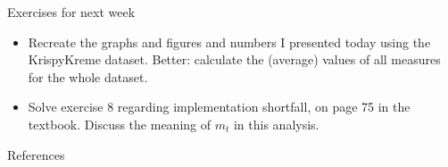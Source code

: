 \documentclass[english,10pt
,aspectratio=169
]{beamer}
\begin{document}
\begin{frame}{Exercises for next week}
	\begin{itemize}
		\item Recreate the graphs and figures and numbers I presented today using the KrispyKreme dataset. Better: calculate the (average) values of all measures for the whole dataset.
		\item Solve exercise 8 regarding implementation shortfall, on page 75 in the textbook.
		Discuss the meaning of $m_t$ in this analysis.
	\end{itemize}
\end{frame}




\appendix
\begin{frame}[allowframebreaks]{References}
	
	
\end{frame}
\end{document}
